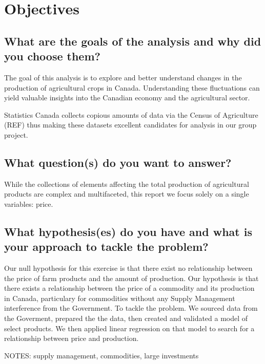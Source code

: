 \section{Objectives}

\subsection{What are the goals of the analysis and why did you choose them?}

The goal of this analysis is to explore and better understand changes in the production of agricultural crops in Canada.
Understanding these fluctuations can yield valuable insights into the Canadian economy and the agricultural sector.

Statistics Canada collects copious amounts of data via the Census of Agriculture (REF) thus making these datasets excellent candidates for analysis in our group project.

\subsection{What question(s) do you want to answer?}

While the collections of elements affecting the total production of agricultural products are complex and multifaceted, this report we focus solely on a single variables: price.


\subsection{What hypothesis(es) do you have and what is your approach to tackle the problem?}

Our null hypothesis for this exercise is that there exist no relationship between the price of farm products and the amount of production. Our hypothesis is that there exists a relationship between the price of a commodity and its production in Canada, particulary for commodities without any Supply Management interference from the Government. 
To tackle the problem. We sourced data from the Goverment, prepared the the data, then created and validated a model of select products.  We then applied linear regression on that model to search for a relationship between price and production. 

NOTES: supply management, commodities, large investments